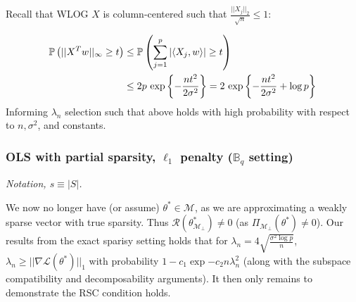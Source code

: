 \documentclass[11pt]{article}
\begin{document}
\begin{enumerate}
        Recall that WLOG $X$ is column-centered such that $\frac{||X_j||_2}{\sqrt{n}} \leq 1$: 

        \begin{align*}
            \operatorname*{\mathbb{P}}\left(|| X^Tw||_\infty \geq t\right)
            &\leq 
            \operatorname*{\mathbb{P}}\left( \sum_{j=1}^p |\langle X_j, w\rangle| \geq t \right)
        \\
        &\leq 2p\ \text{exp}\left\{ -\frac{nt^2}{2\sigma^2} \right\}
        =
        2\ \text{exp}\left\{ -\frac{nt^2}{2\sigma^2} + \log p \right\}
        \end{align*}
        Informing $\lambda_n$ selection such that above holds with high probability with respect to $n, \sigma^2$, and constants. 
    \end{enumerate}
    


\subsubsection{OLS with partial sparsity, $\ell_1$ penalty ($\mathbb{B}_q$ setting)}

{\it Notation, $s\equiv|S|$.}\newline

We now no longer have (or assume) $\theta^* \in \mathcal{M}$, as we are approximating a weakly sparse vector with true sparsity. Thus $\mathcal{R}(\theta^*_{\mathcal{M}_\perp})\neq0$ (as $\Pi_{\mathcal{M_\perp}}(\theta^*)\neq 0$). Our results from the exact sparisy setting holds that for $\lambda_n = 4\sqrt{\frac{\sigma^2 \log p}{n}}$, $\lambda_n \geq ||\nabla\mathcal{L}(\theta^*)||_1$ with probability $1-c_1 \exp{-c_2n\lambda_n^2}$ (along with the subspace compatibility and decomposability arguments). It then only remains to demonstrate the RSC condition holds. \newline 
\end{document}
